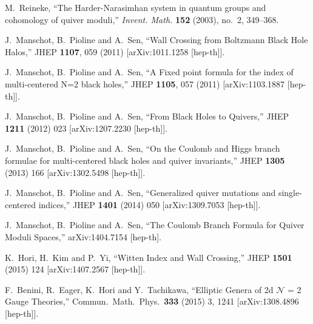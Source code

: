\documentclass[12pt]{article}
\begin{document}
\begin{thebibliography}{9}

M.~Reineke, ``The {H}arder-{N}arasimhan system in quantum groups and cohomology
  of quiver moduli,'' {\em Invent. Math.} {\bf 152} (2003), no.~2, 349--368.

  J.~Manschot, B.~Pioline and A.~Sen,
  ``Wall Crossing from Boltzmann Black Hole Halos,''
  JHEP {\bf 1107}, 059 (2011)
  [arXiv:1011.1258 [hep-th]].

  J.~Manschot, B.~Pioline and A.~Sen,
  ``A Fixed point formula for the index of multi-centered N=2 black holes,''
  JHEP {\bf 1105}, 057 (2011)
  [arXiv:1103.1887 [hep-th]].

  J.~Manschot, B.~Pioline and A.~Sen,
  ``From Black Holes to Quivers,''
  JHEP {\bf 1211} (2012) 023
  [arXiv:1207.2230 [hep-th]].

  J.~Manschot, B.~Pioline and A.~Sen,
  ``On the Coulomb and Higgs branch formulae for multi-centered black holes and quiver invariants,''
  JHEP {\bf 1305} (2013) 166
  [arXiv:1302.5498 [hep-th]].
  
  J.~Manschot, B.~Pioline and A.~Sen,
  ``Generalized quiver mutations and single-centered indices,''
  JHEP {\bf 1401} (2014) 050
  [arXiv:1309.7053 [hep-th]].

    
  J.~Manschot, B.~Pioline and A.~Sen,
  ``The Coulomb Branch Formula for Quiver Moduli Spaces,''
  arXiv:1404.7154 [hep-th].

  K.~Hori, H.~Kim and P.~Yi,
  ``Witten Index and Wall Crossing,''
  JHEP {\bf 1501} (2015) 124
  [arXiv:1407.2567 [hep-th]].
  
  F.~Benini, R.~Eager, K.~Hori and Y.~Tachikawa,
  ``Elliptic Genera of 2d ${\mathcal{N}}$ = 2 Gauge Theories,''
  Commun.\ Math.\ Phys.\  {\bf 333} (2015) 3,  1241
  [arXiv:1308.4896 [hep-th]].


\end{thebibliography}
\end{document}
